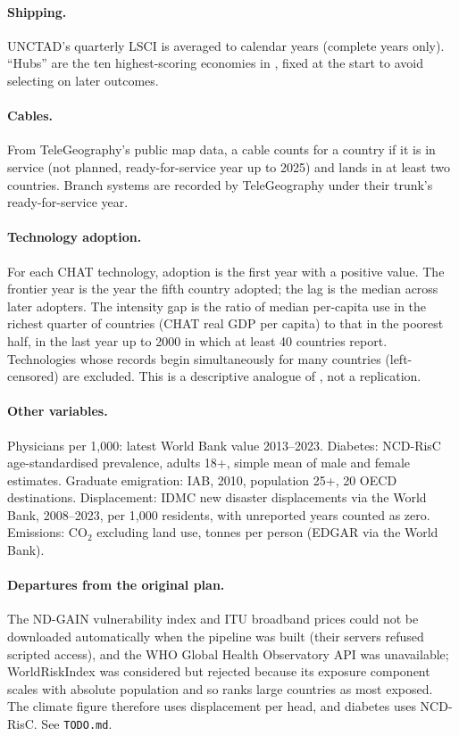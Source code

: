 \paragraph{Shipping.} UNCTAD's quarterly LSCI is averaged to calendar years
(complete years only). \enquote{Hubs} are the ten highest-scoring economies in
\lsciFirstYear{}, fixed at the start to avoid selecting on later outcomes.

\paragraph{Cables.} From TeleGeography's public map data, a cable counts
for a country if it is in service (not planned, ready-for-service year up to
2025) and lands in at least two countries. Branch systems are recorded by
TeleGeography under their trunk's ready-for-service year.

\paragraph{Technology adoption.} For each CHAT technology, adoption is the
first year with a positive value. The frontier year is the year the fifth
country adopted; the lag is the median across later adopters. The intensity
gap is the ratio of median per-capita use in the richest quarter of
countries (CHAT real GDP per capita) to that in the poorest half, in the last
year up to 2000 in which at least 40 countries report. Technologies whose
records begin simultaneously for many countries (left-censored) are excluded.
This is a descriptive analogue of \textcite{comin2010,comin2018}, not a
replication.

\paragraph{Other variables.} Physicians per 1,000: latest World Bank value
2013--2023. Diabetes: NCD-RisC age-standardised prevalence, adults 18+,
simple mean of male and female estimates. Graduate emigration: IAB, 2010,
population 25+, 20 OECD destinations. Displacement: IDMC new disaster
displacements via the World Bank, 2008--2023, per 1,000 residents, with
unreported years counted as zero. Emissions: CO$_2$ excluding land use, tonnes
per person (EDGAR via the World Bank).

\paragraph{Departures from the original plan.} The ND-GAIN vulnerability
index and ITU broadband prices could not be downloaded automatically when the
pipeline was built (their servers refused scripted access), and the WHO
Global Health Observatory API was unavailable; WorldRiskIndex was considered
but rejected because its exposure component scales with absolute population
and so ranks large countries as most exposed. The climate figure therefore
uses displacement per head, and diabetes uses NCD-RisC. See \texttt{TODO.md}.
